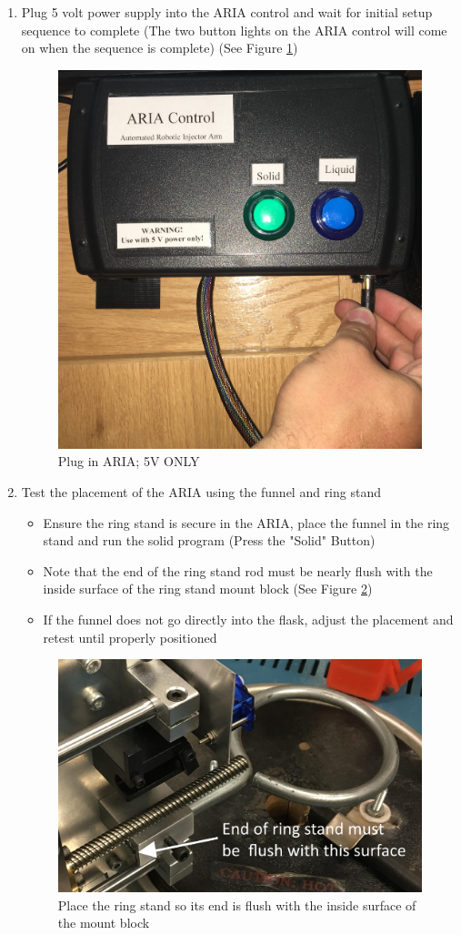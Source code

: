 \documentclass[letterpaper,11pt]{article}
\begin{document}
\begin{enumerate}
    \item Plug 5 volt power supply into the ARIA control and wait for 
        initial setup sequence to complete (The two button lights on the ARIA
        control will come on when the sequence is complete) 
        (See Figure \ref{fig:5V_cable})
        
\begin{figure}[H]
\centering\includegraphics[width=.5\textwidth]{5V_cable.jpg}
\caption{Plug in ARIA; 5V ONLY}
\label{fig:5V_cable}
\end{figure}

    \item Test the placement of the ARIA using the funnel and ring stand
         \begin{itemize}
         \item Ensure the ring stand is secure in the ARIA, place the 
            funnel in the ring stand and run the solid program (Press the  
            "Solid" Button)
		 \item Note that the end of the ring stand rod must be nearly flush with the inside surface
             of the ring stand mount block (See Figure \ref{fig:flush_r_stand})
         \item If the funnel does not go directly into the flask, adjust the placement and retest 
            until properly positioned
         \end{itemize}
         
\begin{figure}[H]
\centering\includegraphics[width=.5\textwidth]{flush_r_stand.jpg}
\caption{Place the ring stand so its end is flush with the inside surface of the mount block}
\label{fig:flush_r_stand}
\end{figure}
         

\end{enumerate}
\end{document}
